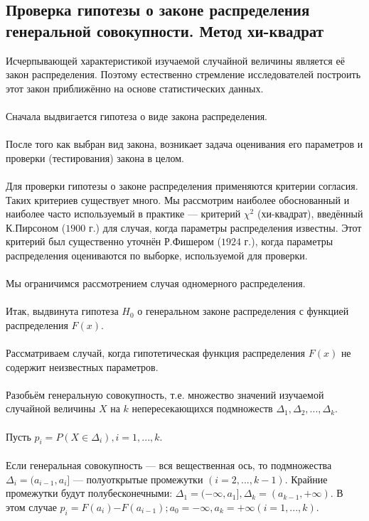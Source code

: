 \documentclass[../body.tex]{subfiles}
\begin{document}
\subsection{Проверка гипотезы о законе распределения генеральной совокупности. Метод хи-квадрат}
Исчерпывающей характеристикой изучаемой случайной величины является её закон распределения. Поэтому естественно стремление исследователей построить этот закон приближённо на основе статистических данных.
\\ \\
Сначала выдвигается гипотеза о виде закона распределения.\\\\
После того как выбран вид закона, возникает задача оценивания его параметров и проверки (тестирования) закона в целом.
\\ \\
Для проверки гипотезы о законе распределения применяются критерии согласия. Таких критериев существует много. Мы рассмотрим наиболее обоснованный и наиболее часто используемый в практике — критерий $\chi^{2}$ (хи-квадрат), введённый К.Пирсоном ($1900$ г.) для случая, когда параметры распределения известны. Этот критерий был существенно уточнён Р.Фишером ($1924$ г.), когда параметры распределения оцениваются по выборке, используемой для проверки.
\\ \\
Мы ограничимся рассмотрением случая одномерного распределения.
\\ \\
Итак, выдвинута гипотеза $H_{0}$ о генеральном законе распределения с функцией распределения $F(x)$.
\\ \\
Рассматриваем случай, когда гипотетическая функция распределения $F(x)$ не содержит неизвестных параметров.
\\ \\
Разобьём генеральную совокупность, т.е. множество значений изучаемой случайной величины $X$ на $k$ непересекающихся подмножеств $\Delta_{1},\Delta_{2}, ... ,\Delta_{k}$.
\\\\
Пусть $p_{i} = P(X \in \Delta_{i}), i = 1, ... ,k$. 
\\\\
Если генеральная совокупность — вся вещественная ось, то подмножества $\Delta_{i} = (a_{i-1},a_{i}]$ — полуоткрытые промежутки $(i = 2, ... ,k-1)$. Крайние промежутки будут полубесконечными: $\Delta_{1} = (−\infty,a_{1}], \Delta_{k} = (a_{k-1},+\infty).$ В этом случае $p_{i} = F(a_{i})$$-$$F(a_{i-1}); a_{0} = −\infty, a_{k} = +\infty (i = 1, ... ,k).$
\end{document}

